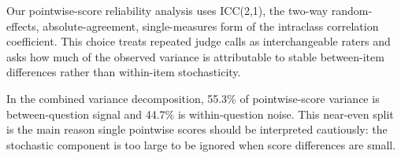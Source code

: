 \documentclass{ijclclp}
\begin{document}
Our pointwise-score reliability analysis uses ICC(2,1), the two-way random-effects, absolute-agreement, single-measures form of the intraclass correlation coefficient. This choice treats repeated judge calls as interchangeable raters and asks how much of the observed variance is attributable to stable between-item differences rather than within-item stochasticity.

In the combined variance decomposition, 55.3\% of pointwise-score variance is between-question signal and 44.7\% is within-question noise. This near-even split is the main reason single pointwise scores should be interpreted cautiously: the stochastic component is too large to be ignored when score differences are small.


\end{document}
